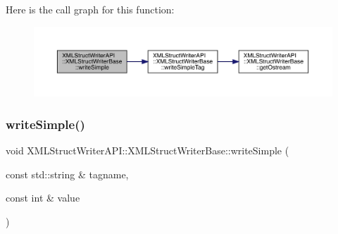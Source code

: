 Here is the call graph for this function\+:
\nopagebreak
\begin{figure}[H]
\begin{center}
\leavevmode
\includegraphics[width=350pt]{db/d4f/classXMLStructWriterAPI_1_1XMLStructWriterBase_a53065b03f0749669f9ed62f6e0875fa4_cgraph}
\end{center}
\end{figure}
\mbox{\label{classXMLStructWriterAPI_1_1XMLStructWriterBase_a53065b03f0749669f9ed62f6e0875fa4}} 
\subsubsection{\texorpdfstring{writeSimple()}{writeSimple()}\hspace{0.1cm}{\footnotesize\ttfamily [2/12]}}
{\footnotesize\ttfamily void X\+M\+L\+Struct\+Writer\+A\+P\+I\+::\+X\+M\+L\+Struct\+Writer\+Base\+::write\+Simple (\begin{DoxyParamCaption}\item[{const std\+::string \&}]{tagname,  }\item[{const int \&}]{value }\end{DoxyParamCaption})\hspace{0.3cm}{\ttfamily [inline]}}

